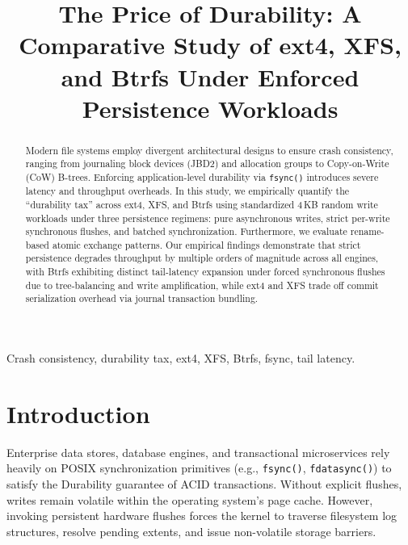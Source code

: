 \documentclass[conference]{IEEEtran}
\begin{document}
\title{The Price of Durability: A Comparative Study of ext4, XFS, and Btrfs Under Enforced Persistence Workloads}

\author{
}

\maketitle

\begin{abstract}
Modern file systems employ divergent architectural designs to ensure crash consistency, ranging from journaling block devices (JBD2) and allocation groups to Copy-on-Write (CoW) B-trees. Enforcing application-level durability via \texttt{fsync()} introduces severe latency and throughput overheads. In this study, we empirically quantify the ``durability tax'' across ext4, XFS, and Btrfs using standardized 4\,KB random write workloads under three persistence regimens: pure asynchronous writes, strict per-write synchronous flushes, and batched synchronization. Furthermore, we evaluate rename-based atomic exchange patterns. Our empirical findings demonstrate that strict persistence degrades throughput by multiple orders of magnitude across all engines, with Btrfs exhibiting distinct tail-latency expansion under forced synchronous flushes due to tree-balancing and write amplification, while ext4 and XFS trade off commit serialization overhead via journal transaction bundling.
\end{abstract}

\begin{IEEEkeywords}
Crash consistency, durability tax, ext4, XFS, Btrfs, fsync, tail latency.
\end{IEEEkeywords}

\section{Introduction}
Enterprise data stores, database engines, and transactional microservices rely heavily on POSIX synchronization primitives (e.g., \texttt{fsync()}, \texttt{fdatasync()}) to satisfy the Durability guarantee of ACID transactions. Without explicit flushes, writes remain volatile within the operating system's page cache. However, invoking persistent hardware flushes forces the kernel to traverse filesystem log structures, resolve pending extents, and issue non-volatile storage barriers.
\end{document}
